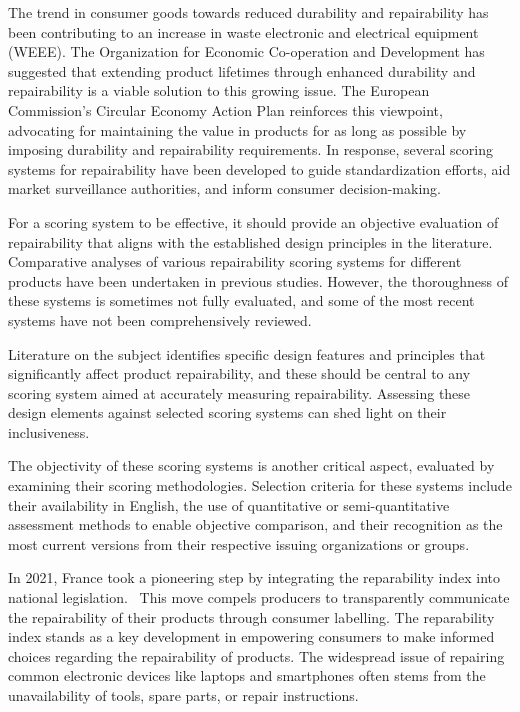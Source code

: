 The trend in consumer goods towards reduced durability and repairability has
been contributing to an increase in waste electronic and electrical equipment
(WEEE). The Organization for Economic Co-operation and Development has
suggested that extending product lifetimes through enhanced durability and
repairability is a viable solution to this growing issue. The European
Commission's Circular Economy Action Plan reinforces this viewpoint, advocating
for maintaining the value in products for as long as possible by imposing
durability and repairability requirements. In response, several scoring systems
for repairability have been developed to guide standardization efforts, aid
market surveillance authorities, and inform consumer decision-making.

For a scoring system to be effective, it should provide an objective evaluation
of repairability that aligns with the established design principles in the
literature. Comparative analyses of various repairability scoring systems for
different products have been undertaken in previous studies. However, the
thoroughness of these systems is sometimes not fully evaluated, and some of the
most recent systems have not been comprehensively reviewed.

Literature on the subject identifies specific design features and principles
that significantly affect product repairability, and these should be central to
any scoring system aimed at accurately measuring repairability. Assessing these
design elements against selected scoring systems can shed light on their
inclusiveness.

The objectivity of these scoring systems is another critical aspect, evaluated
by examining their scoring methodologies. Selection criteria for these systems
include their availability in English, the use of quantitative or
semi-quantitative assessment methods to enable objective comparison, and their
recognition as the most current versions from their respective issuing
organizations or groups.

In 2021, France took a pioneering step by integrating the reparability index
into national legislation.~\cite{france2020repair} This move compels producers
to transparently communicate the repairability of their products through
consumer labelling. The reparability index stands as a key development in
empowering consumers to make informed choices regarding the repairability of
products. The widespread issue of repairing common electronic devices like
laptops and smartphones often stems from the unavailability of tools, spare
parts, or repair instructions.

